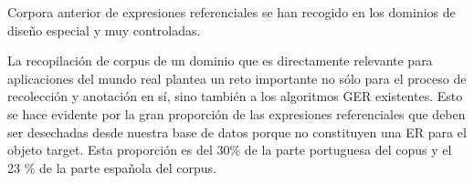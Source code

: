 


Corpora anterior de expresiones referenciales se han recogido en los dominios de dise\~no especial y muy controladas. 

La recopilaci\'on de corpus de un dominio que es directamente relevante para aplicaciones del mundo real plantea un reto importante no s\'olo para el proceso de recolecci\'on y anotaci\'on en s\'{i}, sino tambi\'en a los algoritmos GER existentes. Esto se hace evidente por la gran proporci\'on de las expresiones referenciales que deben ser desechadas desde nuestra base de datos porque no constituyen una ER para el objeto target. Esta proporci\'on es del 30\% de la parte portuguesa del copus y el 23 \% de la parte espa\~nola del corpus.



